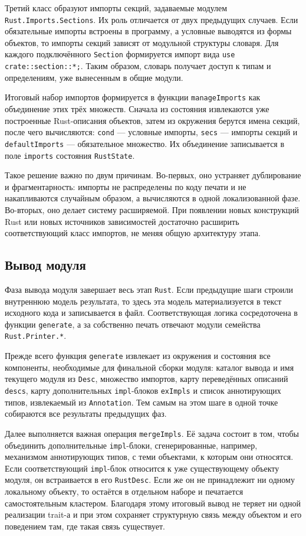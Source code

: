 \documentclass[a4paper,12pt]{article}
\begin{document}
Третий класс образуют импорты секций, задаваемые модулем
\texttt{Rust.Imports.Sections}. Их роль отличается от двух предыдущих случаев. Если
обязательные импорты встроены в программу, а условные выводятся из формы объектов, то
импорты секций зависят от модульной структуры словаря. Для каждого подключённого
\texttt{Section} формируется импорт вида \texttt{use crate::section::*;}. Таким образом,
словарь получает доступ к типам и определениям, уже вынесенным в общие модули.

Итоговый набор импортов формируется в функции \texttt{manageImports} как объединение
этих трёх множеств. Сначала из состояния извлекаются уже построенные Rust-описания
объектов, затем из окружения берутся имена секций, после чего вычисляются:
\texttt{cond} --- условные импорты, \texttt{secs} --- импорты секций и
\texttt{defaultImports} --- обязательное множество. Их объединение записывается в поле
\texttt{imports} состояния \texttt{RustState}.

Такое решение важно по двум причинам. Во-первых, оно устраняет дублирование и
фрагментарность: импорты не распределены по коду печати и не накапливаются случайным
образом, а вычисляются в одной локализованной фазе. Во-вторых, оно делает систему
расширяемой. При появлении новых конструкций Rust или новых источников зависимостей
достаточно расширить соответствующий класс импортов, не меняя общую архитектуру этапа.

\subsection{Вывод модуля}

Фаза вывода модуля завершает весь этап \texttt{Rust}. Если предыдущие шаги строили
внутреннюю модель результата, то здесь эта модель материализуется в текст исходного кода
и записывается в файл. Соответствующая логика сосредоточена в функции
\texttt{generate}, а за собственно печать отвечают модули семейства
\texttt{Rust.Printer.*}.

Прежде всего функция \texttt{generate} извлекает из окружения и состояния все компоненты,
необходимые для финальной сборки модуля: каталог вывода и имя текущего модуля из
\texttt{Desc}, множество импортов, карту переведённых описаний \texttt{descs}, карту
дополнительных \texttt{impl}-блоков \texttt{exImpls} и список аннотирующих типов,
извлекаемый из \texttt{Annotation}. Тем самым на этом шаге в одной точке собираются все
результаты предыдущих фаз.

Далее выполняется важная операция \texttt{mergeImpls}. Её задача состоит в том, чтобы
объединить дополнительные \texttt{impl}-блоки, сгенерированные, например, механизмом
аннотирующих типов, с теми объектами, к которым они относятся. Если соответствующий
\texttt{impl}-блок относится к уже существующему объекту модуля, он встраивается в его
\texttt{RustDesc}. Если же он не принадлежит ни одному локальному объекту, то остаётся в
отдельном наборе и печатается самостоятельным кластером. Благодаря этому итоговый вывод
не теряет ни одной реализации trait-а и при этом сохраняет структурную связь между
объектом и его поведением там, где такая связь существует.
\end{document}
